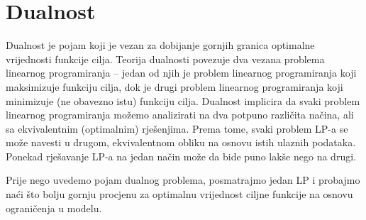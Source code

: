 \documentclass[a4paper, utf8, 11pt, colorlinks]{book}
\begin{document}

  \newpage
 \chapter{Dualnost}
 
 Dualnost je pojam koji je vezan za dobijanje gornjih granica optimalne vrijednosti funkcije cilja. Teorija dualnosti povezuje dva vezana problema linearnog programiranja -- jedan od njih je problem linearnog programiranja koji maksimizuje funkciju cilja, dok je drugi problem linearnog programiranja koji minimizuje (ne obavezno istu) funkciju cilja.  Dualnost implicira da svaki problem linearnog programiranja možemo analizirati na dva potpuno različita načina, ali sa ekvivalentnim (optimalnim) rješenjima.   
  Prema tome, svaki problem LP-a se može navesti u drugom, ekvivalentnom obliku na osnovu istih ulaznih podataka. Ponekad rješavanje LP-a na jedan način može da bide puno lakše nego na drugi.
 
 
 
 Prije nego uvedemo pojam dualnog problema, posmatrajmo jedan LP i probajmo naći što bolju gornju procjenu za optimalnu vrijednost ciljne funkcije na osnovu ograničenja u modelu.
 
\end{document}
